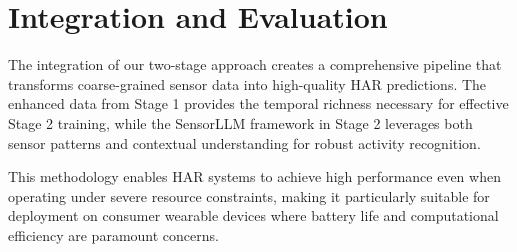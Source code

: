 \section{Integration and Evaluation}

\hspace{2em}The integration of our two-stage approach creates a comprehensive pipeline that transforms coarse-grained sensor data into high-quality HAR predictions. The enhanced data from Stage 1 provides the temporal richness necessary for effective Stage 2 training, while the SensorLLM framework in Stage 2 leverages both sensor patterns and contextual understanding for robust activity recognition.

\hspace{2em}This methodology enables HAR systems to achieve high performance even when operating under severe resource constraints, making it particularly suitable for deployment on consumer wearable devices where battery life and computational efficiency are paramount concerns.
